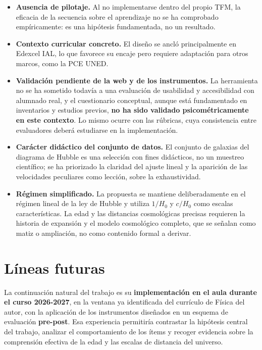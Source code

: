 \begin{itemize}
\item \textbf{Ausencia de pilotaje.} Al no implementarse dentro del propio TFM, la eficacia de la secuencia sobre el aprendizaje no se ha comprobado empíricamente: es una hipótesis fundamentada, no un resultado.

\item \textbf{Contexto curricular concreto.} El diseño se ancló principalmente en Edexcel IAL, lo que favorece su encaje pero requiere adaptación para otros marcos, como la PCE UNED.

\item \textbf{Validación pendiente de la web y de los instrumentos.} La herramienta no se ha sometido todavía a una evaluación de usabilidad y accesibilidad con alumnado real, y el cuestionario conceptual, aunque está fundamentado en inventarios y estudios previos, \textbf{no ha sido validado psicométricamente en este contexto}. Lo mismo ocurre con las rúbricas, cuya consistencia entre evaluadores deberá estudiarse en la implementación.

\item \textbf{Carácter didáctico del conjunto de datos.} El conjunto de galaxias del diagrama de Hubble es una selección con fines didácticos, no un muestreo científico; se ha priorizado la claridad del ajuste lineal y la aparición de las velocidades peculiares como lección, sobre la exhaustividad.

\item \textbf{Régimen simplificado.} La propuesta se mantiene deliberadamente en el régimen lineal de la ley de Hubble y utiliza $1/H_0$ y $c/H_0$ como escalas características. La edad y las distancias cosmológicas precisas requieren la historia de expansión y el modelo cosmológico completo, que se señalan como matiz o ampliación, no como contenido formal a derivar.
\end{itemize}

\section{Líneas futuras}

La continuación natural del trabajo es su \textbf{implementación en el aula durante el curso 2026-2027}, en la ventana ya identificada del currículo de Física del autor, con la aplicación de los instrumentos diseñados en un esquema de evaluación \textbf{pre-post}. Esa experiencia permitiría contrastar la hipótesis central del trabajo, analizar el comportamiento de los ítems y recoger evidencia sobre la comprensión efectiva de la edad y las escalas de distancia del universo.

